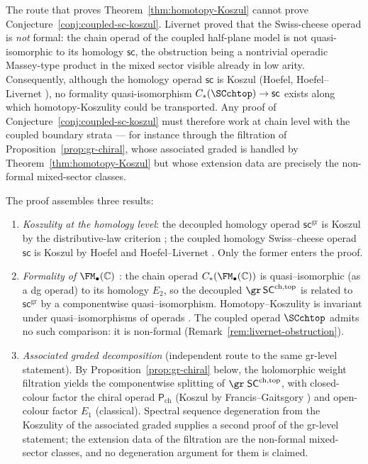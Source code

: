 \begin{remark}
\label{rem:livernet-obstruction}
The route that proves Theorem~\ref{thm:homotopy-Koszul} cannot
prove Conjecture~\ref{conj:coupled-sc-koszul}. Livernet
\cite{Liv15} proved that the Swiss-cheese operad is \emph{not}
formal: the chain operad of the coupled half-plane model is not
quasi-isomorphic to its homology $\mathsf{sc}$, the obstruction
being a nontrivial operadic Massey-type product in the mixed
sector visible already in low arity. Consequently, although the
homology operad $\mathsf{sc}$ is Koszul (Hoefel, Hoefel--Livernet
\cite{Hoe09,HL12}), no formality quasi-isomorphism
$C_\ast(\SCchtop) \to \mathsf{sc}$ exists along which
homotopy-Koszulity could be transported. Any proof of
Conjecture~\ref{conj:coupled-sc-koszul} must therefore work at
chain level with the coupled boundary strata --- for instance
through the filtration of Proposition~\ref{prop:gr-chiral},
whose associated graded is handled by
Theorem~\ref{thm:homotopy-Koszul} but whose extension data are
precisely the non-formal mixed-sector classes.
\end{remark}

\begin{remark}
\label{rmk:hKoszul-evidence}
The proof assembles three results:
\begin{enumerate}[label=(\roman*)]
\item \emph{Koszulity at the homology level}: the decoupled
 homology operad $\mathsf{sc}^{\mathrm{gr}}$ is Koszul by the
 distributive-law criterion \cite{GK94,Val07}; the coupled
 homology Swiss--cheese operad $\mathsf{sc}$ is Koszul by
 Hoefel and Hoefel--Livernet \cite{Hoe09,HL12}. Only the former
 enters the proof.
\item \emph{Formality of $\FM_\bullet(\mathbb C)$}
 \cite{Kon03}: the chain operad $C_\ast(\FM_\bullet(\mathbb C))$ is
 quasi--isomorphic (as a dg operad) to its homology $E_2$, so the
 decoupled $\gr\,\mathsf{SC}^{\mathrm{ch,top}}$ is related to
 $\mathsf{sc}^{\mathrm{gr}}$ by a componentwise
 quasi--isomorphism. Homotopy--Koszulity is invariant under
 quasi--isomorphisms of operads \cite{Val07}. The coupled operad
 $\SCchtop$ admits no such comparison: it is non-formal
 \cite{Liv15} (Remark~\ref{rem:livernet-obstruction}).
\item \emph{Associated graded decomposition} (independent route
 to the same gr-level statement). By
 Proposition~\ref{prop:gr-chiral} below, the holomorphic weight
 filtration yields the componentwise splitting of
 $\gr\;\mathsf{SC}^{\mathrm{ch,top}}$, with closed-colour factor
 the chiral operad $\mathsf P_{\mathrm{ch}}$ (Koszul by
 Francis--Gaitsgory \cite{FG12}) and open-colour factor $E_1$
 (classical). Spectral sequence degeneration from the Koszulity
 of the associated graded supplies a second proof of the gr-level
 statement; the extension data of the filtration are the
 non-formal mixed-sector classes, and no degeneration argument
 for them is claimed.
\end{enumerate}
\end{remark}

